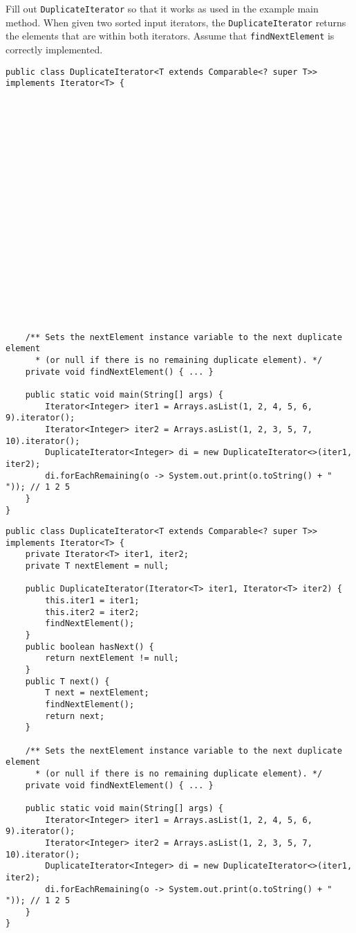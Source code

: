 \question Fill out \lstinline$DuplicateIterator$ so that it works as used in
the example main method. When given two sorted input iterators, the
\lstinline$DuplicateIterator$ returns the elements that are within both
iterators.  Assume that \lstinline$findNextElement$ is correctly implemented.

\ifprintanswers\else
\begin{lstlisting}
public class DuplicateIterator<T extends Comparable<? super T>> implements Iterator<T> {





















    /** Sets the nextElement instance variable to the next duplicate element
      * (or null if there is no remaining duplicate element). */
    private void findNextElement() { ... }

    public static void main(String[] args) {
        Iterator<Integer> iter1 = Arrays.asList(1, 2, 4, 5, 6, 9).iterator();
        Iterator<Integer> iter2 = Arrays.asList(1, 2, 3, 5, 7, 10).iterator();
        DuplicateIterator<Integer> di = new DuplicateIterator<>(iter1, iter2);
        di.forEachRemaining(o -> System.out.print(o.toString() + " ")); // 1 2 5
    }
}
\end{lstlisting}
\fi

\begin{solution}
\begin{lstlisting}
public class DuplicateIterator<T extends Comparable<? super T>> implements Iterator<T> {
    private Iterator<T> iter1, iter2;
    private T nextElement = null;

    public DuplicateIterator(Iterator<T> iter1, Iterator<T> iter2) {
        this.iter1 = iter1;
        this.iter2 = iter2;
        findNextElement();
    }
    public boolean hasNext() {
        return nextElement != null;
    }
    public T next() {
        T next = nextElement;
        findNextElement();
        return next;
    }

    /** Sets the nextElement instance variable to the next duplicate element
      * (or null if there is no remaining duplicate element). */
    private void findNextElement() { ... }

    public static void main(String[] args) {
        Iterator<Integer> iter1 = Arrays.asList(1, 2, 4, 5, 6, 9).iterator();
        Iterator<Integer> iter2 = Arrays.asList(1, 2, 3, 5, 7, 10).iterator();
        DuplicateIterator<Integer> di = new DuplicateIterator<>(iter1, iter2);
        di.forEachRemaining(o -> System.out.print(o.toString() + " ")); // 1 2 5
    }
}
\end{lstlisting}
\end{solution}
